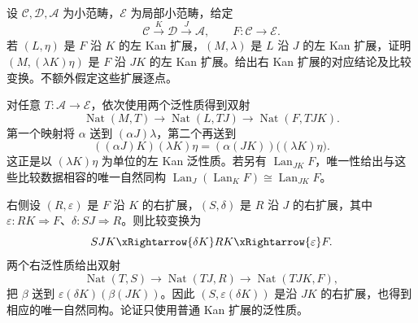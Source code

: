 \begin{optionalexercise}\label{b4:ex:03-composite-kan}
	设 \(\mathcal C,\mathcal D,\mathcal A\) 为小范畴，\(\mathcal E\) 为局部小范畴，给定
	\[
		\mathcal C\xrightarrow{K}\mathcal D\xrightarrow{J}\mathcal A,
		\qquad F:\mathcal C\rightarrow\mathcal E.
	\]
	若 \((L,\eta)\) 是 \(F\) 沿 \(K\) 的左 Kan 扩展，\((M,\lambda)\) 是 \(L\) 沿 \(J\) 的左 Kan 扩展，证明 \((M,(\lambda K)\eta)\) 是 \(F\) 沿 \(JK\) 的左 Kan 扩展。给出右 Kan 扩展的对应结论及比较变换。不额外假定这些扩展逐点。
\end{optionalexercise}
\begin{solution}
	对任意 \(T:\mathcal A\rightarrow\mathcal E\)，依次使用两个泛性质得到双射
	\[
		\operatorname{Nat}(M,T)
		\longrightarrow\operatorname{Nat}(L,TJ)
		\longrightarrow\operatorname{Nat}(F,TJK).
	\]
	第一个映射将 \(\alpha\) 送到 \((\alpha J)\lambda\)，第二个再送到
	\[
		((\alpha J)K)(\lambda K)\eta
		=(\alpha(JK))\bigl((\lambda K)\eta\bigr).
	\]
	这正是以 \((\lambda K)\eta\) 为单位的左 Kan 泛性质。若另有 \(\operatorname{Lan}_{JK}F\)，唯一性给出与这些比较数据相容的唯一自然同构
	\(\operatorname{Lan}_J(\operatorname{Lan}_K F)\cong\operatorname{Lan}_{JK}F\)。

	右侧设 \((R,\varepsilon)\) 是 \(F\) 沿 \(K\) 的右扩展，\((S,\delta)\) 是 \(R\) 沿 \(J\) 的右扩展，其中 \(\varepsilon:RK\Rightarrow F\)、\(\delta:SJ\Rightarrow R\)。则比较变换为
	\[
		SJK\xRightarrow{\delta K}RK\xRightarrow{\varepsilon}F.
	\]
	两个右泛性质给出双射
	\[
		\operatorname{Nat}(T,S)
		\longrightarrow\operatorname{Nat}(TJ,R)
		\longrightarrow\operatorname{Nat}(TJK,F),
	\]
	把 \(\beta\) 送到
	\(\varepsilon(\delta K)(\beta(JK))\)。因此 \((S,\varepsilon(\delta K))\) 是沿 \(JK\) 的右扩展，也得到相应的唯一自然同构。论证只使用普通 Kan 扩展的泛性质。
\end{solution}

